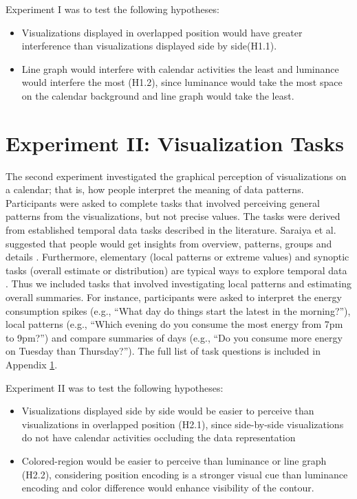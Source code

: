\documentclass[12pt,oneside]{book}
\begin{document}
Experiment I was to test the following hypotheses:
\begin{itemize}
\item{Visualizations displayed in overlapped position would have greater interference than visualizations displayed side by side(H1.1).} 
\item{Line graph would interfere with calendar activities the least and luminance would interfere the most (H1.2), since luminance would take the most space on the calendar background and line graph would take the least.}
\end{itemize}

\section {Experiment II: Visualization Tasks}
The second experiment investigated the graphical perception of visualizations on a calendar; that is, how people interpret the meaning of data patterns.  Participants were asked to complete tasks that involved perceiving general patterns from the visualizations, but not precise values.  The tasks were derived from established temporal data tasks described in the literature.  Saraiya et al. suggested that people would get insights from overview, patterns, groups and details \cite{saraiya_evaluation_2004}.  Furthermore, elementary (local patterns or extreme values) and synoptic tasks (overall estimate or distribution) are typical ways to explore temporal data \cite{andrienko_exploratory_2006}.  Thus we included tasks that involved investigating local patterns and estimating overall summaries.  For instance, participants were asked to interpret the energy consumption spikes (e.g., ``What day do things start the latest in the morning?''), local patterns (e.g., ``Which evening do you consume the most energy from 7pm to 9pm?'') and compare summaries of days (e.g., ``Do you consume more energy on Tuesday than Thursday?''). The full list of task questions is included in Appendix \ref{}.

Experiment II was to test the following hypotheses:
\begin{itemize}
\item{Visualizations displayed side by side would be easier to perceive than  visualizations in overlapped position (H2.1), since side-by-side visualizations do not have calendar activities occluding the data representation} 
\item{Colored-region would be easier to perceive than luminance or line graph (H2.2), considering position encoding is a stronger visual cue than luminance encoding and color difference would enhance visibility of the contour.}
\end{itemize}
\end{document}
